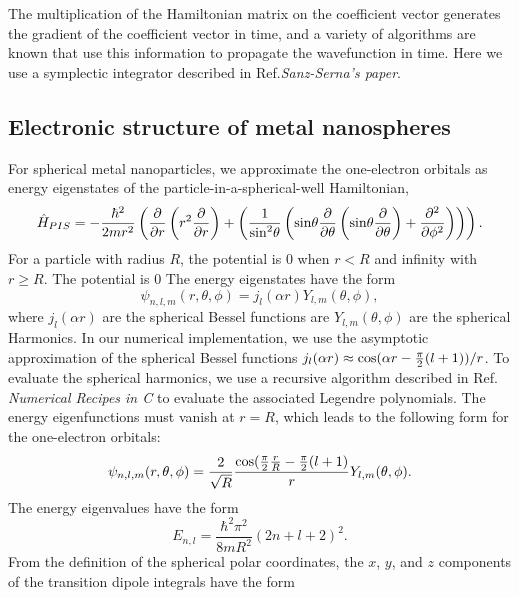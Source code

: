 \documentclass[journal=jacsat,manuscript=article]{achemso}
\begin{document}
The multiplication of the Hamiltonian matrix on the coefficient vector generates the gradient of the coefficient vector in time, and 
a variety of algorithms are known that use this information to propagate the wavefunction in time.  Here we use a symplectic integrator
described in Ref.{\it Sanz-Serna's paper}.

\subsection{Electronic structure of metal nanospheres}
For spherical metal nanoparticles, we approximate the one-electron orbitals as energy eigenstates of the particle-in-a-spherical-well
Hamiltonian, 
\begin{equation}
\hat{H}_{PIS} = -\frac{\hbar^2}{2 m r^2} 
\left(\frac{\partial}{\partial r} \left(r^2 \frac{\partial}{\partial r}\right)
+ \left(\frac{1}{{\rm sin}^2 \theta} 
\left({\rm sin}\theta \frac{\partial}{\partial \theta}
\left({\rm sin}\theta \frac{\partial}{\partial \theta} \right)
+ \frac{\partial^2}{\partial \phi^2} \right) \right)
\right). 
\end{equation}
For a particle with radius $R$, the potential is 0 when $r<R$ and infinity with $r \geq R$. 
The potential is 0 
The energy eigenstates have the form 
\begin{equation}
\psi_{n,l,m}(r,\theta,\phi) = j_l(\alpha r) Y_{l,m}(\theta,\phi),
\end{equation}
where $j_l(\alpha r)$ are the spherical Bessel functions are 
$Y_{l,m}(\theta,\phi)$ are the spherical Harmonics.  
In our numerical implementation, we use the asymptotic approximation of the spherical Bessel functions 
$j_l(\alpha r) \approx {\rm cos}(\alpha r - \frac{\pi}{2} (l+1))/r$.  To evaluate the spherical harmonics, we use a recursive 
algorithm described in Ref. {\it Numerical Recipes in C} to evaluate the associated Legendre polynomials.  The energy eigenfunctions
must vanish at $r=R$, which leads to the following form for the one-electron orbitals:
\begin{equation}
\psi_{n,l,m}(r,\theta,\phi) = 
\frac{2}{\sqrt{R}} \frac{ {\rm cos}( \frac{\pi}{2} \frac{r}{R} - \frac{\pi}{2} (l+1)  }{r} Y_{l,m} (\theta,\phi).
\end{equation}
The energy eigenvalues have the form 
\begin{equation}
E_{n,l} = \frac{\hbar^2 \pi^2}{8 m R^2} \left(2 n + l + 2\right)^2.
\end{equation}
From the definition of the spherical polar coordinates, the $x$, $y$, and $z$ components of the transition dipole integrals have the form
\end{document}
